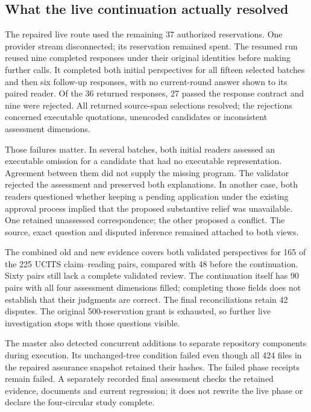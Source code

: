 \subsection{What the live continuation actually resolved}

The repaired live route used the remaining 37 authorized reservations. One
provider stream disconnected; its reservation remained spent. The resumed run
reused nine completed responses under their original identities before making
further calls. It completed both initial perspectives for all fifteen selected
batches and then six follow-up responses, with no current-round answer shown
to its paired reader. Of the 36 returned responses, 27 passed the response
contract and nine were rejected. All returned source-span selections resolved;
the rejections concerned executable quotations, unencoded candidates or
inconsistent assessment dimensions.

Those failures matter. In several batches, both initial readers assessed an
executable omission for a candidate that had no executable representation.
Agreement between them did not supply the missing program. The validator
rejected the assessment and preserved both explanations. In another case, both
readers questioned whether keeping a pending application under the existing
approval process implied that the proposed substantive relief was unavailable.
One retained unassessed correspondence; the other proposed a conflict. The
source, exact question and disputed inference remained attached to both views.

The combined old and new evidence covers both validated perspectives for 165
of the 225 UCITS claim--reading pairs, compared with 48 before the continuation.
Sixty pairs still lack a complete validated review. The continuation itself
has 90 pairs with all four assessment dimensions filled; completing those
fields does not establish that their judgments are correct. The final
reconciliations retain 42 disputes. The original 500-reservation grant is
exhausted, so further live investigation stops with those questions visible.

The master also detected concurrent additions to separate repository components
during execution. Its unchanged-tree condition failed even though all 424 files
in the repaired assurance snapshot retained their hashes. The failed phase
receipts remain failed. A separately recorded final assessment checks the
retained evidence, documents and current regression; it does not rewrite the
live phase or declare the four-circular study complete.
